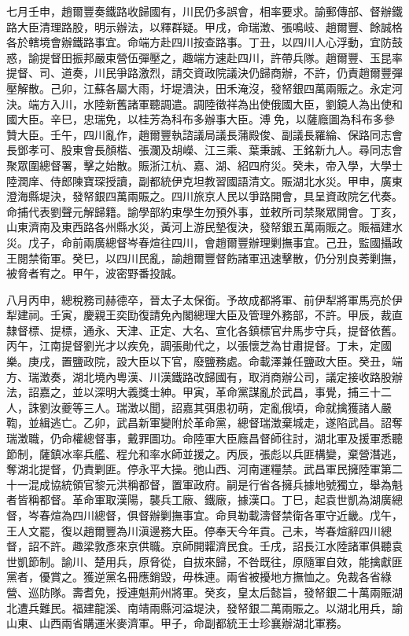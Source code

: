 \begin{pinyinscope}
七月壬申，趙爾豐奏鐵路收歸國有，川民仍多誤會，相率要求。諭郵傳部、督辦鐵路大臣清理路股，明示辦法，以釋群疑。甲戌，命瑞澂、張鳴岐、趙爾豐、餘誠格各於轄境會辦鐵路事宜。命端方赴四川按查路事。丁丑，以四川人心浮動，宜防鼓惑，諭提督田振邦嚴束營伍彈壓之，趣端方速赴四川，許帶兵隊。趙爾豐、玉昆率提督、司、道奏，川民爭路激烈，請交資政院議決仍歸商辦，不許，仍責趙爾豐彈壓解散。己卯，江蘇各屬大雨，圩堤潰決，田禾淹沒，發帑銀四萬兩賑之。永定河決。端方入川，水陸新舊諸軍聽調遣。調陸徵祥為出使俄國大臣，劉鏡人為出使和國大臣。辛巳，忠瑞免，以桂芳為科布多辦事大臣。溥免，以薩廕圖為科布多參贊大臣。壬午，四川亂作，趙爾豐執諮議局議長蒲殿俊、副議長羅綸、保路同志會長鄧孝可、股東會長顏楷、張瀾及胡嶸、江三乘、葉秉誠、王銘新九人。尋同志會聚眾圍總督署，擊之始散。賑浙江杭、嘉、湖、紹四府災。癸未，帝入學，大學士陸潤庠、侍郎陳寶琛授讀，副都統伊克坦教習國語清文。賑湖北水災。甲申，廣東澄海縣堤決，發帑銀四萬兩賑之。四川旅京人民以爭路開會，具呈資政院乞代奏。命捕代表劉聲元解歸籍。諭學部約束學生勿預外事，並敕所司禁聚眾開會。丁亥，山東濟南及東西路各州縣水災，黃河上游民墊復決，發帑銀五萬兩賑之。賑福建水災。戊子，命前兩廣總督岑春煊往四川，會趙爾豐辦理剿撫事宜。己丑，監國攝政王閱禁衛軍。癸巳，以四川民亂，諭趙爾豐督飭諸軍迅速擊散，仍分別良莠剿撫，被脅者宥之。甲午，波密野番投誠。

八月丙申，總稅務司赫德卒，晉太子太保銜。予故成都將軍、前伊犁將軍馬亮於伊犁建祠。壬寅，慶親王奕劻復請免內閣總理大臣及管理外務部，不許。甲辰，裁直隸督標、提標，通永、天津、正定、大名、宣化各鎮標官弁馬步守兵，提督依舊。丙午，江南提督劉光才以疾免，調張勛代之，以張懷芝為甘肅提督。丁未，定國樂。庚戌，置鹽政院，設大臣以下官，廢鹽務處。命載澤兼任鹽政大臣。癸丑，端方、瑞澂奏，湖北境內粵漢、川漢鐵路改歸國有，取消商辦公司，議定接收路股辦法，詔嘉之，並以深明大義獎士紳。甲寅，革命黨謀亂於武昌，事覺，捕三十二人，誅劉汝夔等三人。瑞澂以聞，詔嘉其弭患初萌，定亂俄頃，命就擒獲諸人嚴鞫，並緝逃亡。乙卯，武昌新軍變附於革命黨，總督瑞澂棄城走，遂陷武昌。詔奪瑞澂職，仍命權總督事，戴罪圖功。命陸軍大臣廕昌督師往討，湖北軍及援軍悉聽節制，薩鎮冰率兵艦、程允和率水師並援之。丙辰，張彪以兵匪構變，棄營潛逃，奪湖北提督，仍責剿匪。停永平大操。弛山西、河南運糧禁。武昌軍民擁陸軍第二十一混成協統領官黎元洪稱都督，置軍政府。嗣是行省各擁兵據地號獨立，舉為魁者皆稱都督。革命軍取漢陽，襲兵工廠、鐵廠，據漢口。丁巳，起袁世凱為湖廣總督，岑春煊為四川總督，俱督辦剿撫事宜。命貝勒載濤督禁衛各軍守近畿。戊午，王人文罷，復以趙爾豐為川滇邊務大臣。停奉天今年貢。己未，岑春煊辭四川總督，詔不許。趣梁敦彥來京供職。京師開糶濟民食。壬戌，詔長江水陸諸軍俱聽袁世凱節制。諭川、楚用兵，原脅從，自拔來歸，不咎既往，原隨軍自效，能擒獻匪黨者，優賞之。獲逆黨名冊應銷毀，毋株連。兩省被擾地方撫恤之。免裁各省綠營、巡防隊。壽耆免，授連魁荊州將軍。癸亥，皇太后懿旨，發帑銀二十萬兩賑湖北遭兵難民。福建龍溪、南靖兩縣河溢堤決，發帑銀二萬兩賑之。以湖北用兵，諭山東、山西兩省購運米麥濟軍。甲子，命副都統王士珍襄辦湖北軍務。


\end{pinyinscope}
